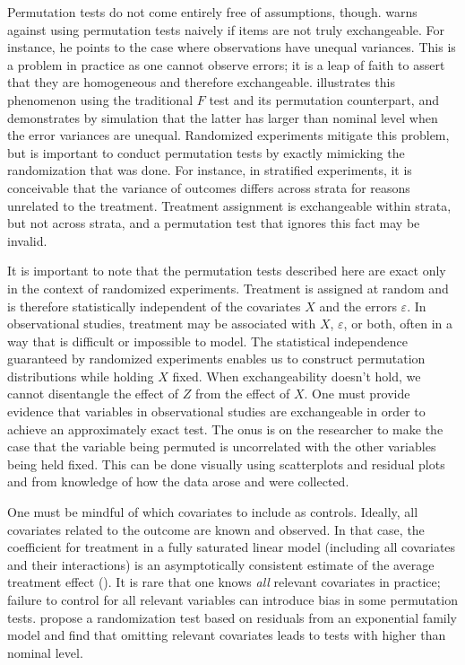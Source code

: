 \documentclass[12pt]{article}
\begin{document}
Permutation tests do not come entirely free of assumptions, though.  
\cite{romano_behavior_1990} warns against using permutation tests naively if items are not truly exchangeable. 
For instance, he points to the case where observations have unequal variances.  
This is a problem in practice as one cannot observe errors; it is a leap of faith to assert that they are homogeneous and therefore exchangeable.
\cite{boik_fisherpitman_1987} illustrates this phenomenon using the traditional $F$ test and its permutation counterpart, 
and demonstrates by simulation that the latter has larger than nominal level when the error variances are unequal.
Randomized experiments mitigate this problem, but is important to conduct permutation tests by exactly mimicking the randomization that was done.
For instance, in stratified experiments, it is conceivable that the variance of outcomes differs across strata for reasons unrelated to the treatment.
Treatment assignment is exchangeable within strata, but not across strata, and a permutation test that ignores this fact may be invalid.

It is important to note that the permutation tests described here are exact only in the context of randomized experiments.
Treatment is assigned at random and is therefore statistically independent of the covariates $X$ and the errors $\varepsilon$.
In observational studies, treatment may be associated with $X$, $\varepsilon$, or both, often in a way that is difficult or impossible to model.
The statistical independence guaranteed by randomized experiments enables us to construct permutation distributions while holding $X$ fixed.
When exchangeability doesn't hold, we cannot disentangle the effect of $Z$ from the effect of $X$.
One must provide evidence that variables in observational studies are exchangeable in order to achieve an approximately exact test.
The onus is on the researcher to make the case that the variable being permuted is uncorrelated with the other variables being held fixed.
This can be done visually using scatterplots and residual plots \cite{freedman_nonstochastic_1983} and from knowledge of how the data arose and were collected.

One must be mindful of which covariates to include as controls.
Ideally, all covariates related to the outcome are known and observed.
In that case, the coefficient for treatment in a fully saturated linear model (including all covariates and their interactions) is an asymptotically consistent estimate of the average treatment effect (\cite{lin_agnostic_2013}).
It is rare that one knows \textit{all} relevant covariates in practice; failure to control for all relevant variables can introduce bias in some permutation tests.
 \cite{gail_tests_1988} propose a randomization test based on residuals from an exponential family model and find that omitting relevant covariates leads to tests with higher than nominal level.
 
\end{document}

